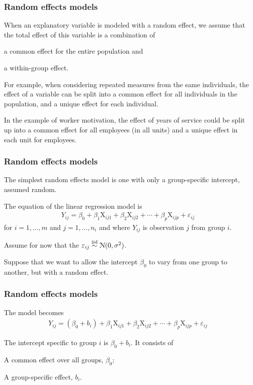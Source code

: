 \documentclass{beamer}
\begin{document}
\begin{frame}[fragile]
\frametitle{Random effects models}
\bi
\item When an explanatory variable is modeled with a random effect, we assume that \alert{the total effect of this variable is a combination of}
\be

\item a \alert{common effect} for the entire population and  
\item a \alert{within-group effect}. 
\ee
\item For example, when considering repeated measures from the same individuals, the effect of a variable can be split into a common effect for all individuals in the population, and a unique effect for each individual. 
\item In the example of worker motivation, the effect of years of service could be split up into a common effect for all employees (in all units) and a unique effect in each unit for employees.
\ei
\end{frame}


% 
% 


\begin{frame}[fragile]
\frametitle{Random effects models}
\bi
\item The simplest random effects model is one with only a group-specific intercept, assumed random. 
\item The equation of the linear regression model is
\begin{align*}
Y_{ij}=\beta_0 + \beta_1 \mathrm{X}_{ij1}+\beta_2\mathrm{X}_{ij2}+\cdots+\beta_p\mathrm{X}_{ijp} + \varepsilon_{ij}
\end{align*}
for $i=1, \ldots, m$ and $j=1, \ldots, n_i$ and where $Y_{ij}$ is observation $j$ from group $i$.
\item Assume for now that the $\varepsilon_{ij} \stackrel{\textnormal{iid}}{\sim} \mathcal{N}(0,\sigma^2)$. 
\item Suppose that we want to allow the intercept $\beta_0$ to vary from one group to another, but with a random effect.
\ei
\end{frame}


\begin{frame}[fragile]
\frametitle{Random effects models}
\bi
\item The model becomes
\begin{align*}
Y_{ij}=(\beta_0+b_i)+ \beta_1 \mathrm{X}_{ij1}+\beta_2\mathrm{X}_{ij2}+\cdots+\beta_p\mathrm{X}_{ijp} + \varepsilon_{ij}
\end{align*}
\item The \alert{intercept} \alert{specific to group $i$} is $\beta_0+b_i$. It consists of
\bi

\item A \alert{common effect over all groups}, $\beta_0$;
\item A \alert{group-specific effect}, $b_i$.
\ei 
\ei
\end{frame}
\end{document}
